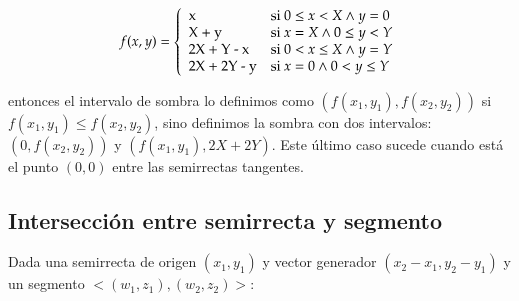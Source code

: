 \begin{itemize}
\vspace{0.2cm}
\begin{center}
\[ f(x, y) = \left\{
               \begin{array}{llll}
				 $x$ & \mbox{si $0 \le x < X \wedge y = 0$} \\
				 $X + y$ & \mbox{si $x = X \wedge 0 \le y < Y$} \\
				 $2X + Y - x$ & \mbox{si $0 < x \le X \wedge y = Y$} \\
				 $2X + 2Y - y$ & \mbox{si $x = 0 \wedge 0 < y \le Y$}
			   \end{array}
			 \right.
\]
\end{center}
\vspace{0.2cm}

\end{itemize}

entonces el intervalo de sombra lo definimos como $(f(x_1,y_1), f(x_2,y_2))$ si
$f(x_1,y_1) \le f(x_2,y_2)$, sino definimos la sombra con dos intervalos: $(0, f(x_2,y_2))$ y
$(f(x_1,y_1), 2X + 2Y)$. Este último caso sucede cuando está el punto $(0,0)$ entre las 
semirrectas tangentes.


\subsection*{Intersección entre semirrecta y segmento}

Dada una semirrecta de origen $(x_1, y_1)$ y vector generador $(x_2 - x_1, y_2 - y_1)$ y un
segmento $<(w_1, z_1), (w_2, z_2)>$:

